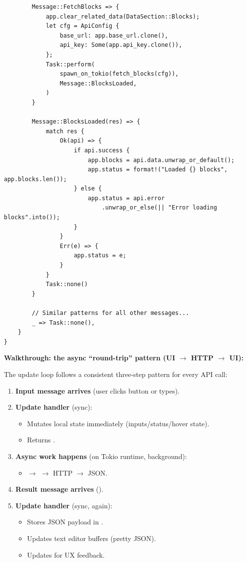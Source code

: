 \begin{listing}[H]
\begin{verbatim}
        Message::FetchBlocks => {
            app.clear_related_data(DataSection::Blocks);
            let cfg = ApiConfig {
                base_url: app.base_url.clone(),
                api_key: Some(app.api_key.clone()),
            };
            Task::perform(
                spawn_on_tokio(fetch_blocks(cfg)),
                Message::BlocksLoaded,
            )
        }

        Message::BlocksLoaded(res) => {
            match res {
                Ok(api) => {
                    if api.success {
                        app.blocks = api.data.unwrap_or_default();
                        app.status = format!("Loaded {} blocks", app.blocks.len());
                    } else {
                        app.status = api.error
                            .unwrap_or_else(|| "Error loading blocks".into());
                    }
                }
                Err(e) => {
                    app.status = e;
                }
            }
            Task::none()
        }

        // Similar patterns for all other messages...
        _ => Task::none(),
    }
}
\end{verbatim}
\end{listing}

\textbf{Walkthrough: the async ``round-trip'' pattern (UI \(\to\) HTTP \(\to\) UI):}

The update loop follows a consistent three-step pattern for every API call:

\begin{enumerate}
  \item \textbf{Input message arrives} (user clicks button or types).
  \item \textbf{Update handler} (sync):
  \begin{itemize}
    \item Mutates local state immediately (inputs/status/hover state).
    \item Returns .
  \end{itemize}
  \item \textbf{Async work happens} (on Tokio runtime, background):
  \begin{itemize}
    \item {} \(\to\)  \(\to\) HTTP \(\to\) JSON.
  \end{itemize}
  \item \textbf{Result message arrives} ().
  \item \textbf{Update handler} (sync, again):
  \begin{itemize}
    \item Stores JSON payload in .
    \item Updates text editor buffers (pretty JSON).
    \item Updates  for UX feedback.
  \end{itemize}
\end{enumerate}

